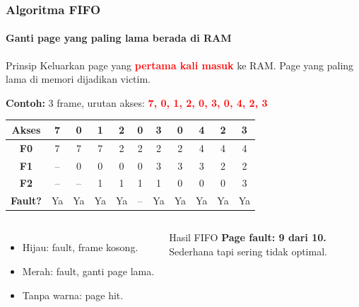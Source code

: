 \documentclass[t,aspectratio=169,xcolor=dvipsnames]{beamer}
\newcommand{\tem}[1]{\textbf{\textcolor{red}{#1}}}
\begin{document}
\begin{frame}
    \frametitle{Algoritma FIFO}
    \framesubtitle{Ganti page yang paling lama berada di RAM}
    \footnotesize

    \begin{block}{Prinsip}
        Keluarkan page yang \tem{pertama kali masuk} ke RAM. Page yang paling lama di memori dijadikan victim.
    \end{block}

    \vspace{0.1cm}
    \textbf{Contoh:} 3 frame, urutan akses: \tem{7, 0, 1, 2, 0, 3, 0, 4, 2, 3}

    \vspace{0.1cm}
    \begin{tabular}{|c|c|c|c|c|c|c|c|c|c|c|}
        \hline
        \textbf{Akses} & 7 & 0 & 1 & 2 & 0 & 3 & 0 & 4 & 2 & 3 \\
        \hline
        \textbf{F0} & \cellcolor{green!20}7 & 7 & 7 & \cellcolor{red!20}2 & 2 & 2 & 2 & \cellcolor{red!20}4 & 4 & 4 \\
        \hline
        \textbf{F1} & -- & \cellcolor{green!20}0 & 0 & 0 & 0 & \cellcolor{red!20}3 & 3 & 3 & \cellcolor{red!20}2 & 2 \\
        \hline
        \textbf{F2} & -- & -- & \cellcolor{green!20}1 & 1 & 1 & 1 & \cellcolor{red!20}0 & 0 & 0 & \cellcolor{red!20}3 \\
        \hline
        \textbf{Fault?} & \cellcolor{green!20}Ya & \cellcolor{green!20}Ya & \cellcolor{green!20}Ya & \cellcolor{red!20}Ya & -- & \cellcolor{red!20}Ya & \cellcolor{red!20}Ya & \cellcolor{red!20}Ya & \cellcolor{red!20}Ya & \cellcolor{red!20}Ya \\
        \hline
    \end{tabular}

    \vspace{0.1cm}
    \begin{columns}[T]
        \begin{itemize}
            \item \colorbox{green!20}{Hijau}: fault, frame kosong.
            \item \colorbox{red!20}{Merah}: fault, ganti page lama.
            \item Tanpa warna: page hit.
        \end{itemize}

        \begin{alertblock}{Hasil FIFO}
            \textbf{Page fault: 9 dari 10.}\\
            Sederhana tapi sering tidak optimal.
        \end{alertblock}
    \end{columns}
\end{frame}
\end{document}
